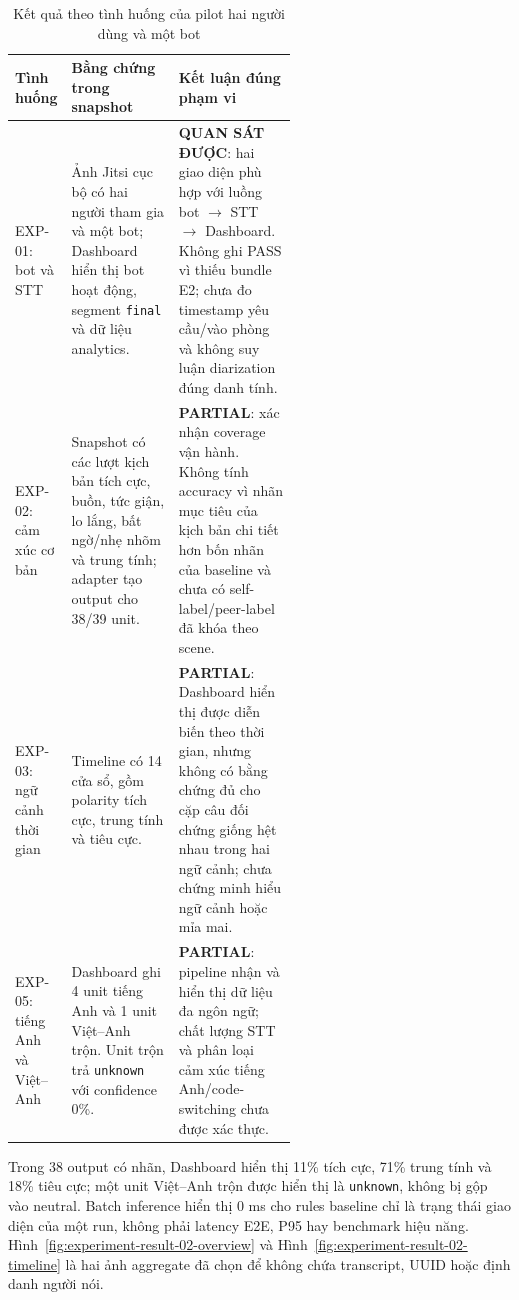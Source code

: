 \begin{table}[H]
\centering
\small
\renewcommand{\arraystretch}{1.16}
\caption{Kết quả theo tình huống của pilot hai người dùng và một bot}
\label{tab:experiment-result-02}
\begin{tabularx}{\linewidth}{>{\raggedright\arraybackslash}p{0.18\linewidth}>{\raggedright\arraybackslash}p{0.38\linewidth}>{\raggedright\arraybackslash}X}
\toprule
Tình huống & Bằng chứng trong snapshot & Kết luận đúng phạm vi \\ \midrule
EXP-01: bot và STT & Ảnh Jitsi cục bộ có hai người tham gia và một bot; Dashboard hiển thị bot hoạt động, segment \texttt{final} và dữ liệu analytics. & \textbf{QUAN SÁT ĐƯỢC}: hai giao diện phù hợp với luồng bot $\rightarrow$ STT $\rightarrow$ Dashboard. Không ghi PASS vì thiếu bundle E2; chưa đo timestamp yêu cầu/vào phòng và không suy luận diarization đúng danh tính. \\
EXP-02: cảm xúc cơ bản & Snapshot có các lượt kịch bản tích cực, buồn, tức giận, lo lắng, bất ngờ/nhẹ nhõm và trung tính; adapter tạo output cho 38/39 unit. & \textbf{PARTIAL}: xác nhận coverage vận hành. Không tính accuracy vì nhãn mục tiêu của kịch bản chi tiết hơn bốn nhãn của baseline và chưa có self-label/peer-label đã khóa theo scene. \\
EXP-03: ngữ cảnh thời gian & Timeline có 14 cửa sổ, gồm polarity tích cực, trung tính và tiêu cực. & \textbf{PARTIAL}: Dashboard hiển thị được diễn biến theo thời gian, nhưng không có bằng chứng đủ cho cặp câu đối chứng giống hệt nhau trong hai ngữ cảnh; chưa chứng minh hiểu ngữ cảnh hoặc mỉa mai. \\
EXP-05: tiếng Anh và Việt--Anh & Dashboard ghi 4 unit tiếng Anh và 1 unit Việt--Anh trộn. Unit trộn trả \texttt{unknown} với confidence 0\%. & \textbf{PARTIAL}: pipeline nhận và hiển thị dữ liệu đa ngôn ngữ; chất lượng STT và phân loại cảm xúc tiếng Anh/code-switching chưa được xác thực. \\
\bottomrule
\end{tabularx}
\end{table}

Trong 38 output có nhãn, Dashboard hiển thị 11\% tích cực, 71\% trung tính và 18\% tiêu cực; một unit Việt--Anh trộn được hiển thị là \texttt{unknown}, không bị gộp vào neutral. Batch inference hiển thị 0 ms cho rules baseline chỉ là trạng thái giao diện của một run, không phải latency E2E, P95 hay benchmark hiệu năng. Hình~\ref{fig:experiment-result-02-overview} và Hình~\ref{fig:experiment-result-02-timeline} là hai ảnh aggregate đã chọn để không chứa transcript, UUID hoặc định danh người nói.

